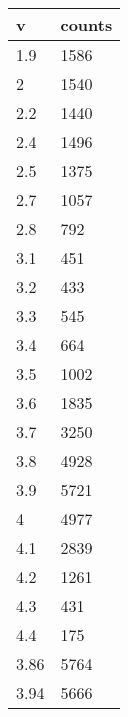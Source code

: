 \begin{table}[H]
    \centering
    \begin{tabular}{|l|l|}
    \hline
        v & counts \\ \hline
        1.9 & 1586 \\ \hline
        2 & 1540 \\ \hline
        2.2 & 1440 \\ \hline
        2.4 & 1496 \\ \hline
        2.5 & 1375 \\ \hline
        2.7 & 1057 \\ \hline
        2.8 & 792 \\ \hline
        3.1 & 451 \\ \hline
        3.2 & 433 \\ \hline
        3.3 & 545 \\ \hline
        3.4 & 664 \\ \hline
        3.5 & 1002 \\ \hline
        3.6 & 1835 \\ \hline
        3.7 & 3250 \\ \hline
        3.8 & 4928 \\ \hline
        3.9 & 5721 \\ \hline
        4 & 4977 \\ \hline
        4.1 & 2839 \\ \hline
        4.2 & 1261 \\ \hline
        4.3 & 431 \\ \hline
        4.4 & 175 \\ \hline
        3.86 & 5764 \\ \hline
        3.94 & 5666 \\ \hline
    \end{tabular}
\end{table}